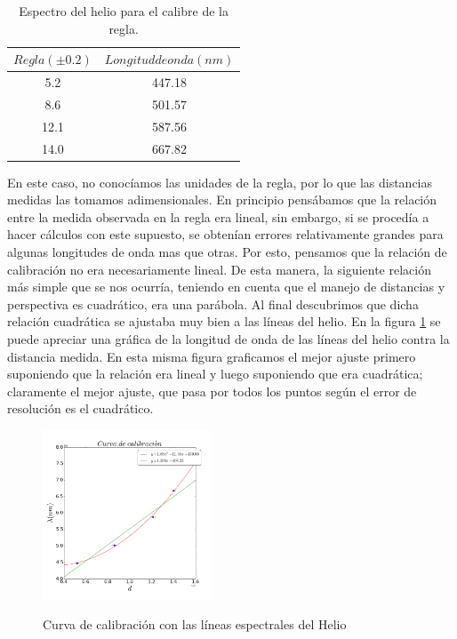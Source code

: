 \documentclass[%
 reprint,
 amsmath,amssymb,
 aps,
]{revtex4-1}
\begin{document}
\begin{table}[h!]
\centering
 \begin{tabular}{|c|c|} 
 \hline
 $Regla (\pm0.2)$ & $Longitud de onda (nm)$ \\ [0.5ex] 
 \hline\hline
5.2 &		447.18\\
8.6 &		501.57\\
12.1 &		587.56\\
14.0 &		667.82\\
[1ex] 
 \hline
 \end{tabular}
 \caption{Espectro del helio para el calibre de la regla.}
 \label{table:helio}
\end{table}

En este caso, no conocíamos las unidades de la regla, por lo que las distancias medidas las tomamos adimensionales. En principio pensábamos que la relación entre la medida observada en la regla era lineal, sin embargo, si se procedía a hacer cálculos con este supuesto, se obtenían errores relativamente grandes para algunas longitudes de onda mas que otras. Por esto, pensamos que la relación de calibración no era necesariamente lineal. De esta manera, la siguiente relación más simple que se nos ocurría, teniendo en cuenta que el manejo de distancias y perspectiva es cuadrático, era una parábola. Al final descubrimos que dicha relación cuadrática se ajustaba muy bien a las líneas del helio. En la figura \ref{fig:calibre} se puede apreciar una gráfica de la longitud de onda de las líneas del helio contra la distancia medida. En esta misma figura graficamos el mejor ajuste primero suponiendo que la relación era lineal y luego suponiendo que era cuadrática; claramente el mejor ajuste, que pasa por todos los puntos según el error de resolución es el cuadrático.\\

\begin{figure}[h]
\caption{Curva de calibración con las líneas espectrales del Helio}
\centering
\includegraphics[width=0.45\textwidth]{calibre}
\label{fig:calibre}
\end{figure}
\end{document}
